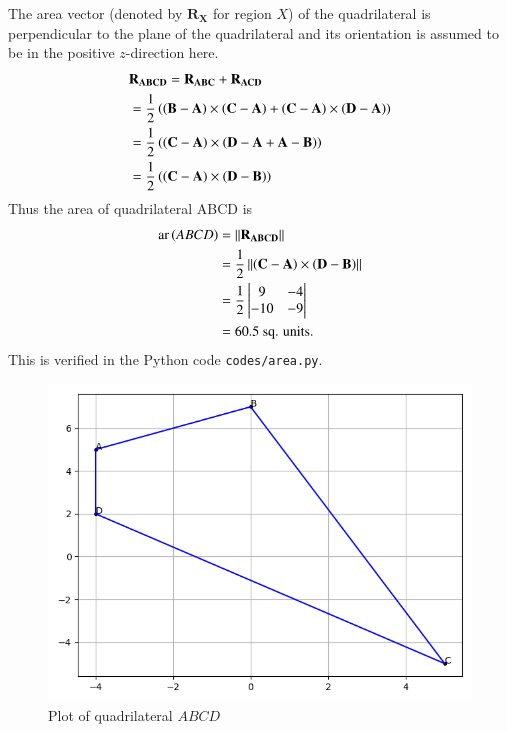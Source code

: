 \documentclass[journal,12pt,twocolumn]{IEEEtran}
\let\vec\mathbf
\begin{document}
\begin{enumerate}
    The area vector (denoted by $\vec{R_X}$ for region $X$) of the quadrilateral 
    is perpendicular to the plane of the quadrilateral and its orientation is 
    assumed to be in the positive $z$-direction here.
    \begin{align}
        &\vec{R_{ABCD}} = \vec{R_{ABC}} + \vec{R_{ACD}} \\
        &= \frac{1}{2}\brak{\brak{\vec{B}-\vec{A}}\times\brak{\vec{C}-\vec{A}} + 
        \brak{\vec{C}-\vec{A}}\times\brak{\vec{D}-\vec{A}}} \\
        &= \frac{1}{2}\brak{\brak{\vec{C}-\vec{A}}\times
        \brak{\vec{D}-\vec{A}+\vec{A}-\vec{B}}} \\
        &= \frac{1}{2}\brak{\brak{\vec{C}-\vec{A}}\times\brak{\vec{D}-\vec{B}}} \\
        \label{eq:area-diag} 
    \end{align}
    Thus the area of quadrilateral ABCD is
    \begin{align}
        \textrm{ar}\brak{ABCD} &= \norm{\vec{R_{ABCD}}} \\
                               &= \frac{1}{2}\norm{\brak{\vec{C}-\vec{A}}\times\brak{\vec{D}-\vec{B}}} \\ 
                               &= \frac{1}{2}\mydet{9&-4\\-10&-9} \\
                               &= 60.5\ \textrm{sq. units.}
        \label{eq:ans}
    \end{align}
    This is verified in the Python code \texttt{codes/area.py}.
    \begin{figure}[!htb]
        \centering
        \includegraphics[width=\columnwidth]{figs/quad.png}
        \caption{Plot of quadrilateral $ABCD$}
        \label{fig:quad}
    \end{figure}
\end{enumerate}
\end{document}

